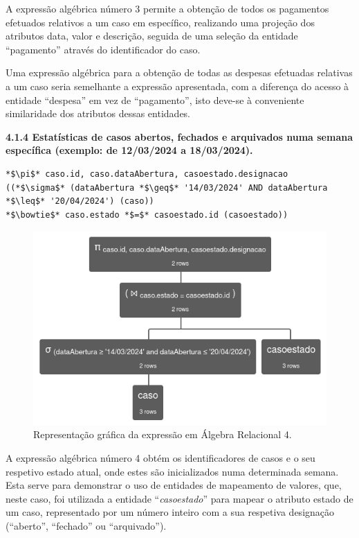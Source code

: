 \documentclass[a4paper,12pt]{scrreprt}
\begin{document}
A expressão algébrica número 3 permite a obtenção de todos os pagamentos efetuados relativos a um caso em específico, realizando uma projeção dos atributos data, valor e descrição, seguida de uma seleção da entidade “pagamento” através do identificador do caso.

Uma expressão algébrica para a obtenção de todas as despesas efetuadas relativas a um caso seria semelhante a expressão apresentada, com a diferença do acesso à entidade “despesa” em vez de “pagamento”, isto deve-se à conveniente similaridade dos atributos dessas entidades. 

\clearpage %
{\large\textbf{4.1.4 Estatísticas de casos abertos, fechados e arquivados numa semana específica (exemplo: de 12/03/2024 a 18/03/2024).}}

\vspace{0.2cm}
\begin{lstlisting}[escapechar=*]
*$\pi$* caso.id, caso.dataAbertura, casoestado.designacao
((*$\sigma$* (dataAbertura *$\geq$* '14/03/2024' AND dataAbertura *$\leq$* '20/04/2024') (caso))
*$\bowtie$* caso.estado *$=$* casoestado.id (casoestado))
\end{lstlisting}

\begin{figure}[!ht]
    \centering
    \includegraphics[scale=0.77]{images/relax/4.png}
    \caption{Representação gráfica da expressão em Álgebra Relacional 4.}
\end{figure}
\vspace{0.2cm}

A expressão algébrica número 4 obtém os identificadores de casos e o seu respetivo estado atual, onde estes são inicializados numa determinada semana. Esta serve para demonstrar o uso de entidades de mapeamento de valores, que, neste caso, foi utilizada a entidade “\textit{casoestado}” para mapear o atributo estado de um caso, representado por um número inteiro com a sua respetiva designação (“aberto”, “fechado” ou “arquivado”).
\end{document}
